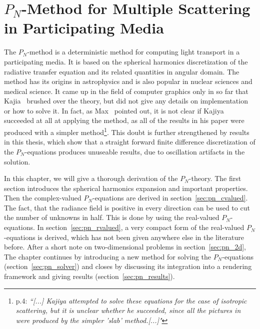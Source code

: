 \chapter{$P_N$-Method for Multiple Scattering in Participating Media}
%
\label{sec:pnmethod}

The $P_N$-method is a deterministic method for computing light transport in a participating media. It is based on the spherical harmonics discretization of the radiative transfer equation and its related quantities in angular domain. The method has its origins in astrophysics and is also popular in nuclear sciences and medical science. It came up in the field of computer graphics only in so far that Kajia~\cite{Kajiya84} brushed over the theory, but did not give any details on implementation or how to solve it. In fact, as Max~\cite{Max95} pointed out, it is not clear if Kajiya succeeded at all at applying the method, as all of the results in his paper were produced with a simpler method\footnote{\cite{Max95} p.4: \emph{``[...] Kajiya attempted to solve these equations for the case of isotropic scattering, but it is unclear whether he succeeded, since all the pictures in \cite{Kajiya84} were produced by the simpler 'slab' method.[...]"}}. This doubt is further strengthened by results in this thesis, which show that a straight forward finite difference discretization of the $P_N$-equations produces unuseable results, due to oscillation artifacts in the solution. 

In this chapter, we will give a thorough derivation of the $P_N$-theory. The first section introduces the spherical harmonics expansion and important properties. Then the complex-valued $P_N$-equations are derived in section~\ref{sec:pn_cvalued}. The fact, that the radiance field is positive in every direction can be used to cut the number of unknowns in half. This is done by using the real-valued $P_N$-equations. In section~\ref{sec:pn_rvalued}, a very compact form of the real-valued $P_N$-equations is derived, which has not been given anywhere else in the literature before. After a short note on two-dimensional problems in section~\ref{sec:pn_2d}, The chapter continues by introducing a new method for solving the $P_N$-equations (section~\ref{sec:pn_solver}) and closes by discussing its integration into a rendering framework and giving results (section~\ref{sec:pn_results}).








